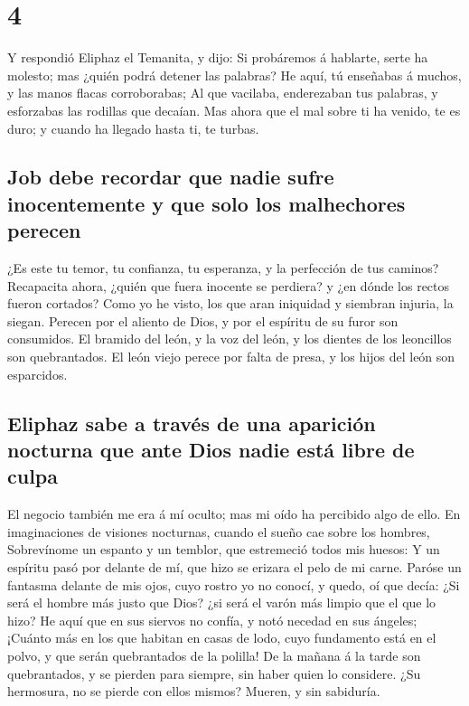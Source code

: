 \hypertarget{section-3}{%
\section{4}\label{section-3}}

 Y respondió Eliphaz el Temanita, y dijo:  Si
probáremos á hablarte, serte ha molesto; mas ¿quién podrá detener las
palabras?  He aquí, tú enseñabas á muchos, y las manos
flacas corroborabas;  Al que vacilaba, enderezaban tus
palabras, y esforzabas las rodillas que decaían.  Mas ahora
que el mal sobre ti ha venido, te es duro; y cuando ha llegado hasta ti,
te turbas.

\hypertarget{job-debe-recordar-que-nadie-sufre-inocentemente-y-que-solo-los-malhechores-perecen}{%
\subsection{Job debe recordar que nadie sufre inocentemente y que solo
los malhechores
perecen}\label{job-debe-recordar-que-nadie-sufre-inocentemente-y-que-solo-los-malhechores-perecen}}

 ¿Es este tu temor, tu confianza, tu esperanza, y la
perfección de tus caminos?  Recapacita ahora, ¿quién que
fuera inocente se perdiera? y ¿en dónde los rectos fueron cortados?
 Como yo he visto, los que aran iniquidad y siembran
injuria, la siegan.  Perecen por el aliento de Dios, y por
el espíritu de su furor son consumidos.  El bramido del
león, y la voz del león, y los dientes de los leoncillos son
quebrantados.  El león viejo perece por falta de presa, y
los hijos del león son esparcidos.

\hypertarget{eliphaz-sabe-a-travuxe9s-de-una-apariciuxf3n-nocturna-que-ante-dios-nadie-estuxe1-libre-de-culpa}{%
\subsection{Eliphaz sabe a través de una aparición nocturna que ante
Dios nadie está libre de
culpa}\label{eliphaz-sabe-a-travuxe9s-de-una-apariciuxf3n-nocturna-que-ante-dios-nadie-estuxe1-libre-de-culpa}}

 El negocio también me era á mí oculto; mas mi oído ha
percibido algo de ello.  En imaginaciones de visiones
nocturnas, cuando el sueño cae sobre los hombres, 
Sobrevínome un espanto y un temblor, que estremeció todos mis huesos:
 Y un espíritu pasó por delante de mí, que hizo se erizara
el pelo de mi carne.  Paróse un fantasma delante de mis
ojos, cuyo rostro yo no conocí, y quedo, oí que decía:  ¿Si
será el hombre más justo que Dios? ¿si será el varón más limpio que el
que lo hizo?  He aquí que en sus siervos no confía, y notó
necedad en sus ángeles;  ¡Cuánto más en los que habitan en
casas de lodo, cuyo fundamento está en el polvo, y que serán
quebrantados de la polilla!  De la mañana á la tarde son
quebrantados, y se pierden para siempre, sin haber quien lo considere.
 ¿Su hermosura, no se pierde con ellos mismos? Mueren, y
sin sabiduría.

